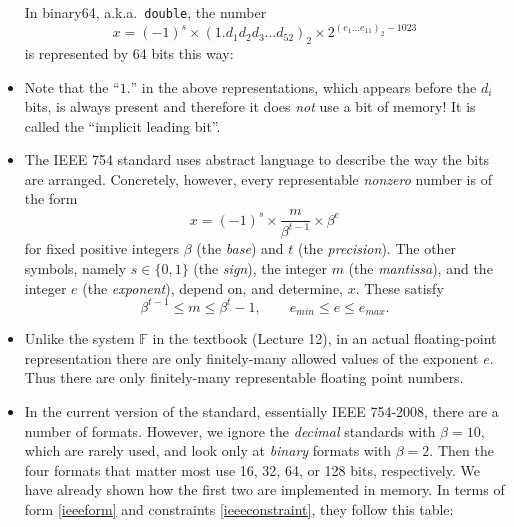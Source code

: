 \documentclass[11pt]{amsart}
\begin{document}
\begin{itemize}
\noindent In binary64, a.k.a.~\texttt{double}, the number
       $$x = (-1)^s \times \left(1.d_1 d_2 d_3 \dots d_{52}\right)_{2} \times 2^{\left(e_1\dots e_{11}\right)_2 - 1023}$$
is represented by 64 bits this way:

\medskip

\item Note that the ``$1.$'' in the above representations, which appears before the $d_i$ bits, is always present and therefore it does \emph{not} use a bit of memory!  It is called the ``implicit leading bit''.

\item The IEEE 754 standard uses abstract language to describe the way the bits are arranged.  Concretely, however, every representable \emph{nonzero} number is of the form
\begin{equation}
x = (-1)^s \times \frac{m}{\beta^{t-1}} \times \beta^e  \label{ieeeform}
\end{equation}
for fixed positive integers $\beta$ (the \emph{base}) and $t$ (the \emph{precision}).  The other symbols, namely $s\in\{0,1\}$ (the \emph{sign}), the integer $m$ (the \emph{mantissa}), and the integer $e$ (the \emph{exponent}), depend on, and determine, $x$.  These satisfy
\begin{equation}
\beta^{t-1} \le m \le \beta^t - 1, \qquad e_{min} \le e \le e_{max}.  \label{ieeeconstraint}
\end{equation}

\item Unlike the system $\mathbb{F}$ in the textbook (Lecture 12), in an actual floating-point representation there are only finitely-many allowed values of the exponent $e$.  Thus there are only finitely-many representable floating point numbers.

\item In the current version of the standard, essentially IEEE 754-2008, there are a number of formats.  However, we ignore the \emph{decimal} standards with $\beta=10$, which are rarely used, and look only at \emph{binary} formats with $\beta=2$.  Then the four formats that matter most use 16, 32, 64, or 128 bits, respectively.  We have already shown how the first two are implemented in memory.  In terms of form \eqref{ieeeform} and constraints \eqref{ieeeconstraint}, they follow this table:


\end{itemize}
\end{document}
